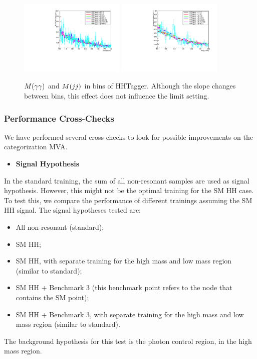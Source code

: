 \begin{figure}[thb]
  \centering
  \includegraphics[width=0.45\textwidth]{figures/sec-cats/mva/hhtag_mgg}\hfil
  \includegraphics[width=0.45\textwidth]{figures/sec-cats/mva/hhtag_mjj}\hfil
  \caption{$M(\gamma\gamma)$ and $M(jj)$ in bins of HHTagger. Although the slope changes between bins, this effect does not influence the limit setting.}
  \label{fig:mva_mggmjj}
\end{figure}

\subsubsection{Performance Cross-Checks}

We have performed several cross checks to look for possible improvements on the categorization MVA. 

\begin{itemize}
\item \textbf{Signal Hypothesis}
\end{itemize}

In the standard training, the sum of all non-resonant samples are used as signal hypothesis. 
However, this might not be the optimal training for the SM HH case. 
To test this, we compare the performance of different trainings assuming the SM HH signal. 
The signal hypotheses tested are:
\begin{itemize}
\item All non-resonant (standard);
\item SM HH;
\item SM HH, with separate training for the high mass and low mass region (similar to standard);
\item SM HH + Benchmark 3 (this benchmark point refers to the node that contains the SM point);
\item SM HH + Benchmark 3, with separate training for the high mass and low mass region (similar to standard).
\end{itemize}
The background hypothesis for this test is the photon control region, in the high mass region. 

